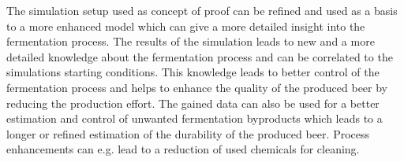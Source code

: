 The simulation setup used as concept of proof can be refined and used as a basis to a more enhanced model which can give a more detailed
insight into the fermentation process. The results of the simulation leads to new and a more detailed knowledge about the fermentation
process and can be correlated to the simulations starting conditions. This knowledge leads to better control of the fermentation process
and helps to enhance the quality of the produced beer by reducing the production effort. The gained data can also be used for a better
estimation and control of unwanted fermentation byproducts which leads to a longer or refined estimation of the durability of the produced
beer. Process enhancements can e.g. lead to a reduction of used chemicals for cleaning.


